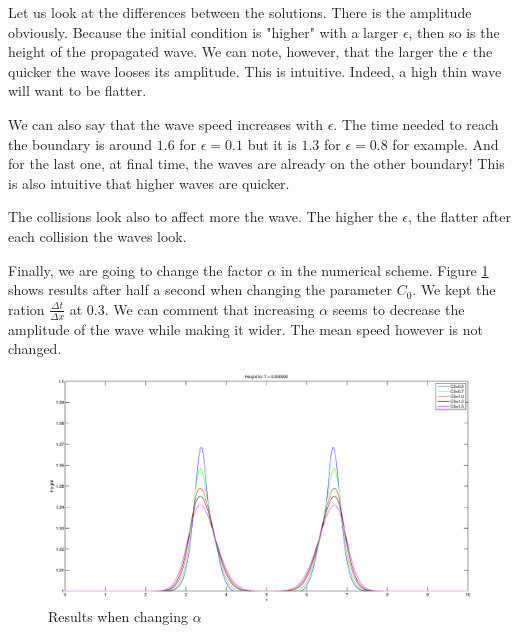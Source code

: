 Let us look at the differences between the solutions. There is the amplitude obviously. Because the initial condition is "higher" with a larger $\epsilon$, then so is the height of the propagated wave. We can note, however, that the larger the $\epsilon$ the quicker the wave looses its amplitude. This is intuitive. Indeed, a high thin wave will want to be flatter.

We can also say that the wave speed increases with $\epsilon$. The time needed to reach the boundary is around $1.6$ for $\epsilon=0.1$ but it is $1.3$ for $\epsilon=0.8$ for example. And for the last one, at final time, the waves are already on the other boundary! This is also intuitive that higher waves are quicker.

The collisions look also to affect more the wave. The higher the $\epsilon$, the flatter after each collision the waves look.

Finally, we are going to change the factor $\alpha$ in the numerical scheme. Figure \ref{alpha} shows results after half a second when changing the parameter $C_0$. We kept the ration $\frac{\Delta t}{\Delta x}$ at $0.3$. We can comment that increasing $\alpha$ seems to decrease the amplitude of the wave while making it wider. The mean speed however is not changed.
\begin{figure}
\begin{center}
\includegraphics[scale=0.4]{alpha.eps}
\caption{Results when changing $\alpha$}
\label{alpha}
\end{center}
\end{figure}





